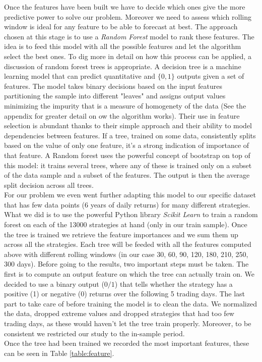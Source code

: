 Once the features have been built we have to decide which ones give the more predictive power to solve our problem. Moreover we need to assess which rolling window is ideal for any feature to be able to forecast at best. The approach chosen at this stage is to use a \textit{Random Forest} model to rank these features. The idea is to feed this model with all the possible features and let the algorithm select the best ones. To dig more in detail on how this process can be applied, a discussion of random forest trees is appropriate. A decision tree is a machine learning model that can predict quantitative and $\{0,1\}$ outputs given a set of features. The model takes binary decisions based on the input features partitioning the sample into different "leaves" and assigns output values minimizing the impurity that is a measure of homogenety of the data (See the appendix for greater detail on ow the algorithm works). Their use in feature selection is abundant thanks to their simple approach and their ability to model dependencies between features. If a tree, trained on some data, consistently splits based on the value of only one feature, it's a strong indication of importance of that feature. A Random forest uses the powerful concept of bootstrap on top of this model: it trains several trees, where any of these is trained only on a subset of the data sample and a subset of the features. The output is then the average split decision across all trees.\\
For our problem we even went further adapting this model to our specific dataset that has few data points (6 years of daily returns) for many different strategies. What we did is to use the powerful Python library \textit{Scikit Learn} to train a random forest on each of the 13000 strategies at hand (only in our train sample). Once the tree is trained we retrieve the feature importances and we sum them up across all the strategies. Each tree will be feeded with all the features computed above with different rolling windows (in our case 30, 60, 90, 120, 180, 210, 250, 300 days). Before going to the results, two important steps must be taken. The first is to compute an output feature on which the tree can actually train on. We decided to use a binary output ($0/1$) that tells whether the strategy has a positive (1) or negative (0) returns over the following 5 trading days. %
The last part to take care of before training the model is to clean the data. We normalized the data, dropped extreme values and dropped strategies that had too few trading days, as these would haven't let the tree train properly. Moreover, to be consistent we restricted our study to the in-sample period.\\
Once the tree had been trained we recorded the most important features, these can be seen in Table \ref{table:feature}.

